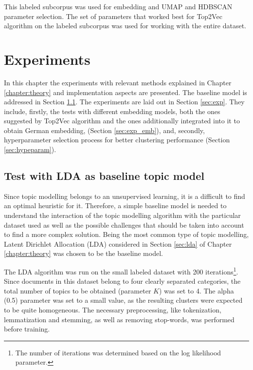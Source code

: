 \documentclass[fontsize=12pt,a4paper,twoside,openany]{scrbook}
\begin{document}
This labeled subcorpus was used for embedding and UMAP and HDBSCAN parameter selection. The set of parameters that worked best for Top2Vec algorithm on the labeled subcorpus was used for working with the entire dataset.

\chapter{Experiments}
\label{chap:exp}

In this chapter the experiments with relevant methods explained in Chapter \ref{chapter:theory} and implementation aspects are presented. The baseline model is addressed in Section \ref{sec:lda_baseline}. The experiments are laid out in Section \ref{sec:exp}. They include, firstly, the tests with different embedding models, both the ones suggested by Top2Vec algorithm and the ones additionally integrated into it to obtain German embedding, (Section \ref{sec:exp_emb}), and, secondly, hyperparameter selection process for better clustering performance (Section \ref{sec:hypeparam}).

\section{Test with LDA as baseline topic model}
\label{sec:lda_baseline}

Since topic modelling belongs to an unsupervised learning, it is a difficult to find an optimal heuristic for it. Therefore, a simple baseline model is needed to understand the interaction of the topic modelling algorithm with the particular dataset used as well as the possible challenges that should be taken into account to find a more complex solution. Being the most common type of topic modelling, Latent Dirichlet Allocation (LDA) considered in Section \ref{sec:lda} of Chapter \ref{chapter:theory} was chosen to be the baseline model.

The LDA algorithm was run on the small labeled dataset with 200 iterations\footnote{The number of iterations was determined based on the log likelihood parameter.}. Since documents in this dataset belong to four clearly separated categories, the total number of topics to be obtained (parameter \(K\)) was set to 4. The alpha (0.5) parameter was set to a small value, as the resulting clusters were expected to be quite homogeneous. The necessary preprocessing, like tokenization, lemmatization and stemming, as well as removing stop-words, was performed before training.
\end{document}
